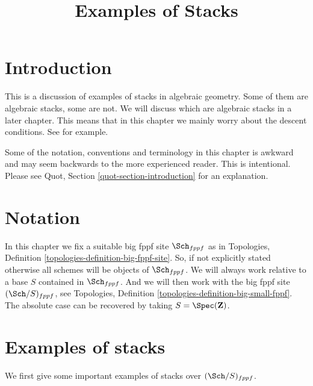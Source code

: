 

%


\title{Examples of Stacks}


\maketitle

\label{section-phantom}

\tableofcontents

\section{Introduction}
\label{section-introduction}

\noindent
This is a discussion of examples of stacks in algebraic geometry.
Some of them are algebraic stacks, some are not.
We will discuss which are algebraic stacks in a later chapter.
This means that in this chapter we mainly worry about the descent
conditions. See \cite{Vis2} for example.

\medskip\noindent
Some of the notation, conventions and terminology in this chapter is awkward
and may seem backwards to the more experienced reader. This is intentional.
Please see Quot, Section \ref{quot-section-introduction} for an
explanation.




\section{Notation}
\label{section-notation}

\noindent
In this chapter we fix a suitable big fppf site $\Sch_{fppf}$
as in Topologies, Definition \ref{topologies-definition-big-fppf-site}.
So, if not explicitly stated otherwise all schemes will be objects
of $\Sch_{fppf}$.
We will always work relative to a base $S$ contained in $\Sch_{fppf}$.
And we will then work with the big fppf site $(\Sch/S)_{fppf}$,
see Topologies, Definition \ref{topologies-definition-big-small-fppf}.
The absolute case can be recovered by taking
$S = \Spec(\mathbf{Z})$.




\section{Examples of stacks}
\label{section-examples-stacks}

\noindent
We first give some important examples of stacks over
$(\Sch/S)_{fppf}$.





